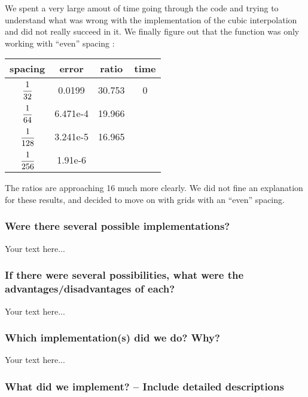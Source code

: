 \documentclass[accepted,single]{gipaper}
\begin{document}
We spent a very large amout of time going through the code and trying to understand what was wrong with the implementation of the cubic interpolation and did not really succeed in it. We finally figure out that the function was only working with ``even'' spacing :
\begin{center}
\begin{tabular}{|c|c|c|c|}
  \hline
  spacing & error & ratio & time\\
  \hline
  $\cfrac{1}{32}$ & 0.0199 & 30.753 &0\\[0.2cm] 
  $\cfrac{1}{64}$ & 6.471e-4 & 19.966 &\\[0.2cm]
  $\cfrac{1}{128}$ & 3.241e-5 & 16.965 &\\[0.2cm]
  $\cfrac{1}{256}$ & 1.91e-6 & & \\[0.2cm]
  \hline
\end{tabular}
\end{center}
The ratios are approaching 16 much more clearly. We did not fine an explanation for these results, and decided to move on with grids with an ``even'' spacing.
\subsubsection{Were there several possible implementations?}

Your text here...

\subsubsection{If there were several possibilities,
what were the advantages/disadvantages of each? }

Your text here...

\subsubsection{Which implementation(s) did we do? Why?}

Your text here...

\subsubsection{What did we implement? -- Include detailed descriptions}
\end{document}
